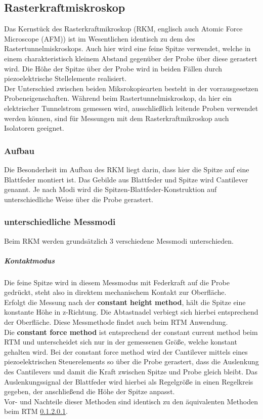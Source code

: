\documentclass[a4paper,twoside,final]{article}
\begin{document}
\subsection{Rasterkraftmiskroskop}
Das Kernstück des Rasterkraftmikroskop (RKM, englisch auch Atomic Force Microscope (AFM)) ist im Wesentlichen identisch zu dem des Rastertunnelmiskroskops. Auch hier wird eine feine Spitze verwendet, welche in einem charakteristisch kleinem Abstand gegenüber der Probe über diese gerastert wird. Die Höhe der Spitze über der Probe wird in beiden Fällen durch piezoelektrische Stellelemente realisiert. \\
Der Unterschied zwischen beiden Miksrokopiearten besteht in der vorrausgesetzen Probeneigenschaften. Während beim Rastertunnelmiskroskop, da hier ein elektrischer Tunnelstrom gemessen wird, ausschließlich leitende Proben verwendet werden können, sind für Messungen mit dem Rasterkraftmikroskop auch Isolatoren geeignet.

\subsubsection{Aufbau}
Die Besonderheit im Aufbau des RKM liegt darin, dass hier die Spitze auf eine Blattfeder montiert ist. Das Gebilde aus Blattfeder und Spitze wird Cantilever genannt. Je nach Modi wird die Spitzen-Blattfeder-Konstruktion auf unterschiedliche Weise über die Probe gerastert.

\subsubsection{unterschiedliche Messmodi}
Beim RKM werden grundsätzlich 3 verschiedene Messmodi unterschieden.
\subparagraph{Kontaktmodus}
Die feine Spitze wird in diesem Messmodus mit Federkraft auf die Probe gedrückt, steht also in direktem mechanischem Kontakt zur Oberfläche. \\
Erfolgt die Messung nach der \textbf{constant height method}, hält die Spitze eine konstante Höhe in z-Richtung. Die Abtastnadel verbiegt sich hierbei entsprechend der Oberfläche. Diese Messmethode findet auch beim RTM Anwendung. \\
Die \textbf{constant force method} ist entsprechend der constant current method beim RTM und unterscheidet sich nur in der gemessenen Größe, welche konstant gehalten wird. Bei der constant force method wird der Cantilever mittels eines piezoelektrischen Steuerelements so über die Probe gerastert, dass die Auslenkung des Cantilevers und damit die Kraft zwischen Spitze und Probe gleich bleibt. Das Auslenkungssignal der Blattfeder wird hierbei als Regelgröße in einen Regelkreis gegeben, der anschließend die Höhe der Spitze anpasst.\\
Vor- und Nachteile dieser Methoden sind identisch zu den äquivalenten Methoden beim RTM \ref{}.
\end{document}

